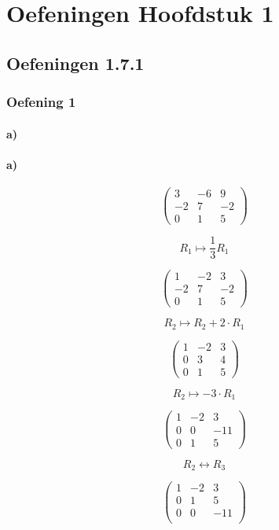 \documentclass[lineaire_algebra_oplossingen.tex]{subfiles}
\begin{document}
\chapter{Oefeningen Hoofdstuk 1}

\section{Oefeningen 1.7.1}
\subsection{Oefening 1}
\subsubsection*{a)}
\subsubsection*{a)}
$$\begin{pmatrix}
3 & -6 & 9\\
-2 & 7 & -2\\
0 & 1 & 5
\end{pmatrix}
$$

$$ R_1 \longmapsto \frac{1}{3} R_1$$

$$\begin{pmatrix}
1 & -2 & 3\\
-2 & 7 & -2\\
0 & 1 & 5
\end{pmatrix}
$$

$$R_2 \longmapsto R_2 + 2\cdot R_1$$

$$\begin{pmatrix}
1 & -2 & 3\\
0 & 3 & 4\\
0 & 1 & 5
\end{pmatrix}
$$

$$ R_2 \longmapsto - 3\cdot R_1 $$

$$\begin{pmatrix}
1 & -2 & 3\\
0 & 0 & -11\\
0 & 1 & 5
\end{pmatrix}
$$

$$R_2 \leftrightarrow R_3$$

$$\begin{pmatrix}
1 & -2 & 3\\
0 & 1 & 5\\
0 & 0 & -11\\
\end{pmatrix}
$$
\end{document}
